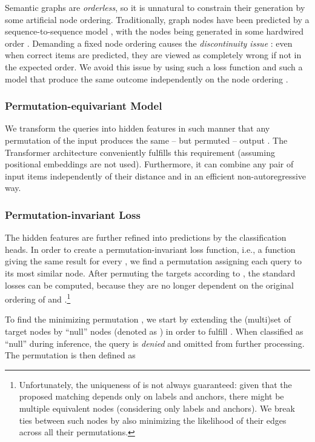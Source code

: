 \documentclass[11pt,a4paper]{article}
\begin{document}
Semantic graphs are \emph{orderless}, so it is unnatural to constrain their generation by some artificial node ordering. Traditionally, graph nodes have been predicted by a sequence-to-sequence model \cite{peng2017addressing}, with the nodes being generated in some hardwired order \cite{zhang2019amr}. Demanding a fixed node ordering causes the \emph{discontinuity issue} \cite{zhang2019deep}: even when correct items are predicted, they are viewed as completely wrong if not in the expected order. We avoid this issue by using such a loss function and such a model that produce the same outcome independently on the node ordering \cite{zaheer2017deep}. 

\subsubsection{Permutation-equivariant Model}

We transform the queries  into hidden features  in such manner that any permutation  of the input  produces the same -- but permuted -- output
. The Transformer architecture \cite{vaswani2017attention} conveniently fulfills this requirement (assuming positional embeddings are not used). Furthermore, it can combine any pair of input items independently of their distance and in an efficient non-autoregressive way.

\subsubsection{Permutation-invariant Loss}
\label{sec:pi_loss}

The hidden features  are further refined into predictions  by the classification heads. In order to create a permutation-invariant loss function, i.e., a function  giving the same result for every , we find a permutation  assigning each query to its most similar node. After permuting the targets according to , the standard losses can be computed, because they are no longer dependent on the original ordering of  and .\hspace{-.08em}\footnote{Unfortunately, the uniqueness of  is not always guaranteed: given that the proposed matching depends only on labels and anchors, there might be multiple equivalent nodes (considering only labels and anchors). We break ties between such nodes by also minimizing the likelihood of their edges across all their permutations.}

To find the minimizing permutation , we start by extending the (multi)set of target nodes  by ``null'' nodes (denoted as ) in order to fulfill . When classified as ``null'' during inference, the query is \emph{denied} and omitted from further processing. The permutation  is then defined as
\end{document}
